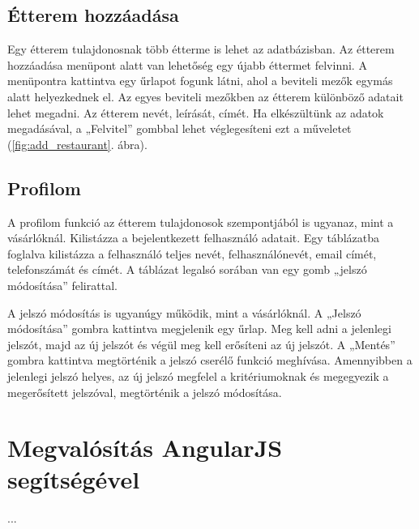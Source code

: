 \subsection{Étterem hozzáadása}

Egy étterem tulajdonosnak több étterme is lehet az adatbázisban. Az étterem hozzáadása menüpont alatt van lehetőség egy újabb éttermet felvinni. 
A menüpontra kattintva egy űrlapot fogunk látni, ahol a beviteli mezők egymás alatt helyezkednek el. Az egyes beviteli mezőkben az étterem különböző adatait lehet megadni. Az étterem nevét, leírását, címét. Ha elkészültünk az adatok megadásával, a „Felvitel” gombbal lehet véglegesíteni ezt a műveletet (\ref{fig:add_restaurant}. ábra).

\subsection{Profilom}

A profilom funkció az étterem tulajdonosok szempontjából is ugyanaz, mint a vásárlóknál. Kilistázza a bejelentkezett felhasználó adatait. Egy táblázatba foglalva kilistázza a felhasználó teljes nevét, felhasználónevét, email címét, telefonszámát és címét. A táblázat legalsó sorában van egy gomb „jelszó módosítása” felirattal.

A jelszó módosítás is ugyanúgy működik, mint a vásárlóknál. A „Jelszó módosítása” gombra kattintva megjelenik egy űrlap. Meg kell adni a jelenlegi jelszót, majd az új jelszót és végül meg kell erősíteni az új jelszót. A „Mentés” gombra kattintva megtörténik a jelszó cserélő funkció meghívása. Amennyibben a jelenlegi jelszó helyes, az új jelszó megfelel a kritériumoknak és megegyezik a megerősített jelszóval, megtörténik a jelszó módosítása.

\section{Megvalósítás AngularJS segítségével}

...
